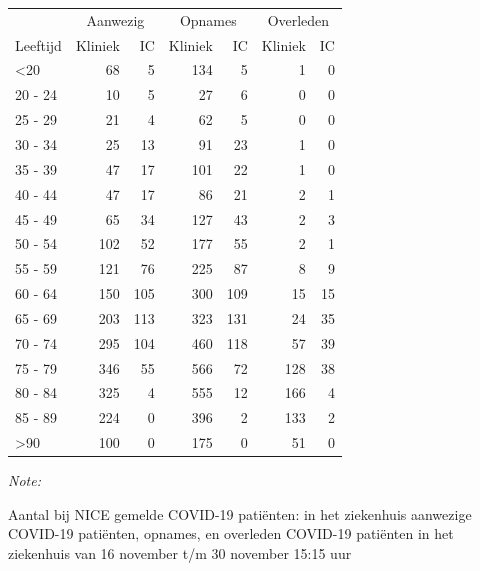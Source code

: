 \documentclass[
  english,
  man,floatsintext]{apa6}
\begin{document}
\begin{table}
\centering\begingroup\fontsize{10}{12}\selectfont

\begin{threeparttable}
\begin{tabular}{lrrrrrr}
\toprule
\multicolumn{1}{c}{ } & \multicolumn{2}{c}{Aanwezig} & \multicolumn{2}{c}{Opnames} & \multicolumn{2}{c}{Overleden} \\
\cmidrule(l{3pt}r{3pt}){2-3} \cmidrule(l{3pt}r{3pt}){4-5} \cmidrule(l{3pt}r{3pt}){6-7}
Leeftijd & Kliniek & IC & Kliniek & IC & Kliniek & IC\\
\midrule
<20 & 68 & 5 & 134 & 5 & 1 & 0\\
20 - 24 & 10 & 5 & 27 & 6 & 0 & 0\\
25 - 29 & 21 & 4 & 62 & 5 & 0 & 0\\
30 - 34 & 25 & 13 & 91 & 23 & 1 & 0\\
35 - 39 & 47 & 17 & 101 & 22 & 1 & 0\\
40 - 44 & 47 & 17 & 86 & 21 & 2 & 1\\
45 - 49 & 65 & 34 & 127 & 43 & 2 & 3\\
50 - 54 & 102 & 52 & 177 & 55 & 2 & 1\\
55 - 59 & 121 & 76 & 225 & 87 & 8 & 9\\
60 - 64 & 150 & 105 & 300 & 109 & 15 & 15\\
65 - 69 & 203 & 113 & 323 & 131 & 24 & 35\\
70 - 74 & 295 & 104 & 460 & 118 & 57 & 39\\
75 - 79 & 346 & 55 & 566 & 72 & 128 & 38\\
80 - 84 & 325 & 4 & 555 & 12 & 166 & 4\\
85 - 89 & 224 & 0 & 396 & 2 & 133 & 2\\
>90 & 100 & 0 & 175 & 0 & 51 & 0\\
\bottomrule
\end{tabular}
\begin{tablenotes}
\item \textit{Note: } 
\item Aantal bij NICE gemelde COVID-19 patiënten: in het ziekenhuis aanwezige COVID-19 patiënten, opnames, en overleden COVID-19 patiënten in het ziekenhuis van 16 november t/m 30 november 15:15 uur
\end{tablenotes}
\end{threeparttable}
\endgroup{}
\end{table}

\newpage
\end{document}
